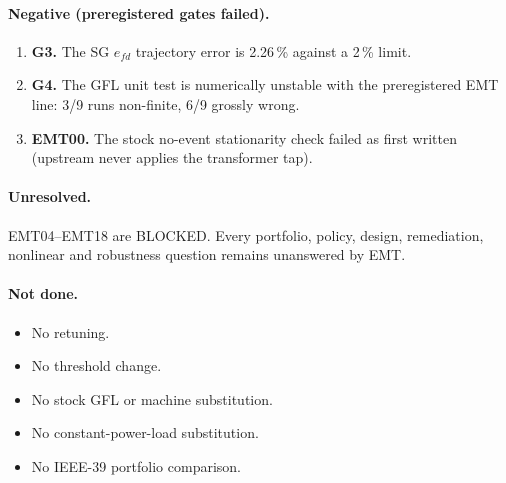 \documentclass[10pt,a4paper]{article}
\begin{document}
\paragraph{Negative (preregistered gates failed).}
\begin{enumerate}
\item \textbf{G3.} The SG $e_{fd}$ trajectory error is 2.26\,\% against a
  2\,\% limit.
\item \textbf{G4.} The GFL unit test is numerically unstable with the
  preregistered EMT line: 3/9 runs non-finite, 6/9 grossly wrong.
\item \textbf{EMT00.} The stock no-event stationarity check failed as first
  written (upstream never applies the transformer tap).
\end{enumerate}

\paragraph{Unresolved.} EMT04--EMT18 are BLOCKED. Every portfolio, policy,
design, remediation, nonlinear and robustness question remains unanswered by
EMT.

\paragraph{Not done.}
\begin{itemize}
\item No retuning.
\item No threshold change.
\item No stock GFL or machine substitution.
\item No constant-power-load substitution.
\item No IEEE-39 portfolio comparison.
\end{itemize}

\end{document}
